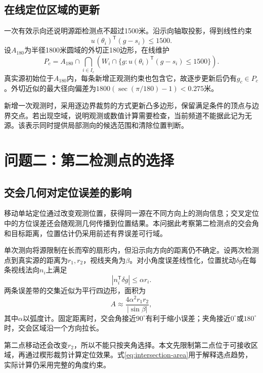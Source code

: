 \documentclass[UTF8,fontset=fandol,a4paper,zihao=-4]{ctexart}
\begin{document}
\subsection{在线定位区域的更新}\label{subsec:online-region}
一次有效示向还说明源距检测点不超过1500米。沿示向轴取投影，得到线性约束
\begin{equation}
u(\theta_i)^{\mathsf T}(g-s_i)\le1500.
\end{equation}
设$A_{180}$为半径1800米圆域的外切正180边形，在线维护
\begin{equation}\label{eq:online-region}
P_c=A_{180}\cap\bigcap_{i\in I_c}
\left(W_i\cap\{g:u(\theta_i)^{\mathsf T}(g-s_i)\le1500\}\right).
\end{equation}
真实源初始位于$A_{180}$内，每条新增正观测约束也包含它，故逐步更新后仍有$g_c\in P_c$。外切近似的最大径向偏差为$1800(\sec(\pi/180)-1)<0.275$米。

新增一次观测时，采用逐边界裁剪的方式更新凸多边形，保留满足条件的顶点与边界交点\cite{sutherland}。若出现空域，说明观测或数值计算需要检查，当前频道不能据此记为无源。该表示同时提供局部测向的候选范围和清除位置判断。

\section{问题二：第二检测点的选择}
\subsection{交会几何对定位误差的影响}
移动单站定位通过改变观测位置，获得同一源在不同方向上的测向信息\cite{qin}；交叉定位中的方位误差还会随观测几何传播到位置结果\cite{li}。本问据此考察第二检测点的交会角和目标距离，位置估计仍采用前述有界误差可行域。


单次测向将源限制在长而窄的扇形内，但沿示向方向的距离仍不确定。设两次检测点到真实源的距离为$r_1,r_2$，视线夹角为$\beta$。对小角度误差线性化，位置扰动$\delta g$在每条视线法向$n_i$上满足
\begin{equation}
|n_i^{\mathsf T}\delta g|\le\alpha r_i.
\end{equation}
两条误差带的交集近似为平行四边形，面积为
\begin{equation}\label{eq:intersection-area}
A\approx\frac{4\alpha^2r_1r_2}{|\sin\beta|},
\end{equation}
其中$\alpha$以弧度计。固定距离时，交会角接近$90^\circ$有利于缩小误差；夹角接近$0^\circ$或$180^\circ$时，交会区域沿一个方向拉长。

第二点移动还会改变$r_2$，所以不能只按夹角选择。本文先限制第二点位于可接收区域，再通过楔形裁剪计算定位效果。式\eqref{eq:intersection-area}用于解释选点趋势，实际计算仍采用完整的角度约束。
\end{document}
